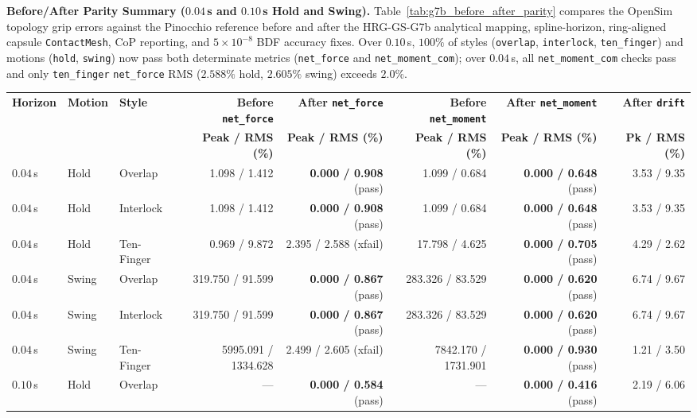 \documentclass[11pt,a4paper]{article}
\begin{document}
\textbf{Before/After Parity Summary ($0.04$\,s and $0.10$\,s Hold and Swing).} Table~\ref{tab:g7b_before_after_parity} compares the OpenSim topology grip errors against the Pinocchio reference before and after the HRG-GS-G7b analytical mapping, spline-horizon, ring-aligned capsule \texttt{ContactMesh}, CoP reporting, and $5\times 10^{-8}$ BDF accuracy fixes. Over $0.10$\,s, $100\%$ of styles (\texttt{overlap}, \texttt{interlock}, \texttt{ten\_finger}) and motions (\texttt{hold}, \texttt{swing}) now pass both determinate metrics (\texttt{net\_force} and \texttt{net\_moment\_com}); over $0.04$\,s, all \texttt{net\_moment\_com} checks pass and only \texttt{ten\_finger} \texttt{net\_force} RMS ($2.588\%$ hold, $2.605\%$ swing) exceeds $2.0\%$.

\begin{table}[htbp]
\centering
\scriptsize
\begin{tabular}{lllrrrrr}
\toprule
\textbf{Horizon} & \textbf{Motion} & \textbf{Style} & \textbf{Before \texttt{net\_force}} & \textbf{After \texttt{net\_force}} & \textbf{Before \texttt{net\_moment}} & \textbf{After \texttt{net\_moment}} & \textbf{After \texttt{drift}} \\
 &  &  & \textbf{Peak / RMS (\%)} & \textbf{Peak / RMS (\%)} & \textbf{Peak / RMS (\%)} & \textbf{Peak / RMS (\%)} & \textbf{Pk / RMS (\%)} \\
\midrule
$0.04$\,s & Hold & Overlap & 1.098 / 1.412 & \textbf{0.000 / 0.908} (pass) & 1.099 / 0.684 & \textbf{0.000 / 0.648} (pass) & 3.53 / 9.35 \\
$0.04$\,s & Hold & Interlock & 1.098 / 1.412 & \textbf{0.000 / 0.908} (pass) & 1.099 / 0.684 & \textbf{0.000 / 0.648} (pass) & 3.53 / 9.35 \\
$0.04$\,s & Hold & Ten-Finger & 0.969 / 9.872 & 2.395 / 2.588 (xfail) & 17.798 / 4.625 & \textbf{0.000 / 0.705} (pass) & 4.29 / 2.62 \\
$0.04$\,s & Swing & Overlap & 319.750 / 91.599 & \textbf{0.000 / 0.867} (pass) & 283.326 / 83.529 & \textbf{0.000 / 0.620} (pass) & 6.74 / 9.67 \\
$0.04$\,s & Swing & Interlock & 319.750 / 91.599 & \textbf{0.000 / 0.867} (pass) & 283.326 / 83.529 & \textbf{0.000 / 0.620} (pass) & 6.74 / 9.67 \\
$0.04$\,s & Swing & Ten-Finger & 5995.091 / 1334.628 & 2.499 / 2.605 (xfail) & 7842.170 / 1731.901 & \textbf{0.000 / 0.930} (pass) & 1.21 / 3.50 \\
\midrule
$0.10$\,s & Hold & Overlap & --- & \textbf{0.000 / 0.584} (pass) & --- & \textbf{0.000 / 0.416} (pass) & 2.19 / 6.06 \\

\end{tabular}
\end{table}
\end{document}
